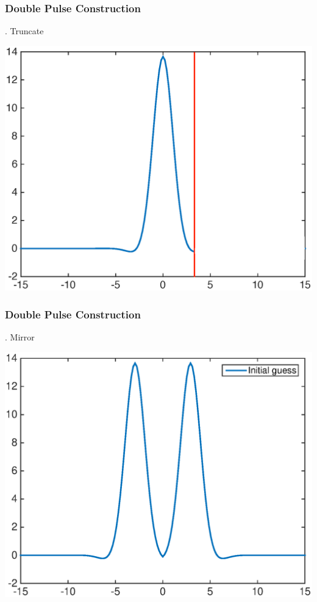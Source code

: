 \documentclass[16pt]{beamer}
\begin{document}
\begin{frame}
	\frametitle{Double Pulse Construction}
	\fontsize{16}{7.2}. Truncate
	\begin{center}
	\includegraphics[width=0.8\linewidth]{images/singlecut}
	\end{center}
\end{frame}

\begin{frame}
	\frametitle{Double Pulse Construction}
	\fontsize{16}{7.2}. Mirror
	\begin{center}
	\includegraphics[width=0.8\linewidth]{images/dp1before.eps}
	\end{center}
\end{frame}
\end{document}

